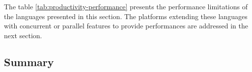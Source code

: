 

% 


The table \ref{tab:productivity-performance} presents the performance limitations of the languages presented in this section.
The platforms extending these languages with concurrent or parallel features to provide performances are addressed in the next section.



\subsection{Summary} \label{chapter3:software-productivity:summary}

